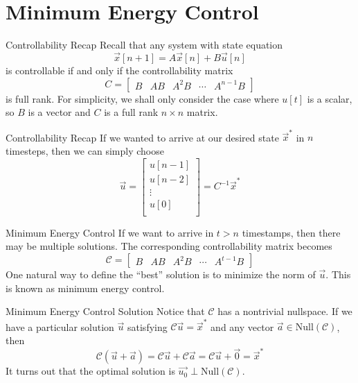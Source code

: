 \section{Minimum Energy Control}

\begin{frame}{Controllability Recap}
	Recall that any system with state equation
	\[
		\vec{x}[n+1] = A\vec{x}[n] + B\vec{u}[n]
	\]
   	is controllable if and only if the controllability matrix
    \[
        C = 
        \begin{bmatrix}
        B & AB & A^2B & \cdots & A^{n-1}B
        \end{bmatrix}
    \]
    is full rank. For simplicity, we shall only consider the case where $u[t]$ is a scalar, so $B$ is a vector and $C$ is a full rank $n \times n$ matrix.
\end{frame}

\begin{frame}{Controllability Recap}
	If we wanted to arrive at our desired state $\vec{x}^*$ in $n$ timesteps, then we can simply choose
	\[
		\vec{u} 
		=
		\begin{bmatrix}
			u[n-1] \\
			u[n-2] \\
			\vdots \\
			u[0] \\
		\end{bmatrix}
		=
		C^{-1}\vec{x}^*
	\]
\end{frame}

\begin{frame}{Minimum Energy Control}
	If we want to arrive in $t > n$ timestamps, then there may be multiple solutions. The corresponding controllability matrix becomes
    \[
        \mathscr{C} = 
        \begin{bmatrix}
        B & AB & A^2B & \cdots & A^{t-1}B
        \end{bmatrix}
    \]
	One natural way to define the ``best'' solution is to minimize the norm of $\vec{u}$. This is known as minimum energy control.
\end{frame}

\begin{frame}{Minimum Energy Control Solution}
	Notice that $\mathscr{C}$ has a nontrivial nullspace. If we have a particular solution $\vec{u}$ satisfying $\mathscr{C} \vec{u} = \vec{x}^*$ and any vector $\vec{a} \in \mathrm{Null}(\mathscr{C})$, then
	\[
	\mathscr{C}(\vec{u} + \vec{a}) = \mathscr{C}\vec{u} + \mathscr{C}\vec{a} = \mathscr{C}\vec{u} + \vec{0} = \vec{x}^*
	\]
	It turns out that the optimal solution is $\vec{u_0} \perp \mathrm{Null}(\mathscr{C})$.
\end{frame}

